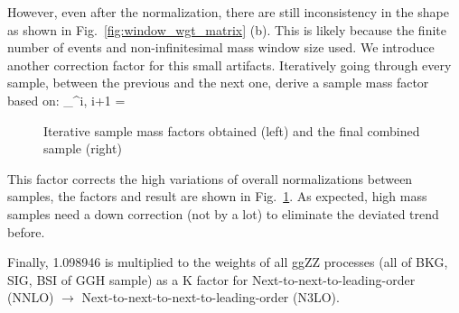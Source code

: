 However, even after the normalization, there are still inconsistency in the shape as shown
in Fig.~\ref{fig:window_wgt_matrix} (b). This is likely because the finite number of events
and non-infinitesimal mass window size used. We introduce another correction factor for
this small artifacts. Iteratively going through every sample, between the previous and the
next one, derive a sample mass factor based on:
\be
{}_^{i, i+1} = 
\ee

\begin{figure}[htb]
    \begin{center}
    \end{center}
    \caption{Iterative sample mass factors obtained (left) and the final combined sample (right)}
    \label{fig:LHE_rewgt}
\end{figure}

This factor corrects the high variations of overall normalizations between samples, the factors and result
are shown in Fig.~\ref{fig:LHE_rewgt}. As expected, high mass samples need a down correction (not by a lot)
to eliminate the deviated trend before.

Finally, 1.098946 is multiplied to the weights of all ggZZ processes (all of BKG, SIG, BSI
of GGH sample) as a K factor for Next-to-next-to-leading-order (NNLO) $\rightarrow$ 
Next-to-next-to-next-to-leading-order (N3LO).

